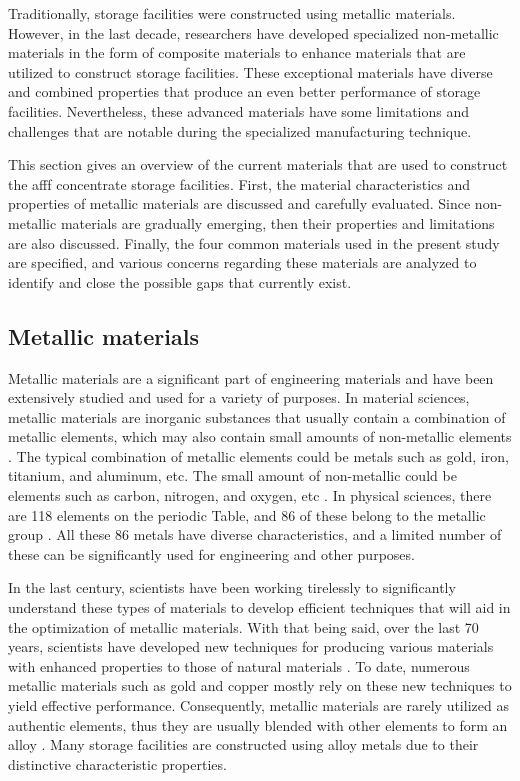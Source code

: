 Traditionally, storage facilities were constructed using metallic materials. However, in the last decade, researchers have developed specialized non-metallic materials in the form of composite materials to enhance materials that are utilized to construct storage facilities. These exceptional materials have diverse and combined properties that produce an even better performance of storage facilities. Nevertheless, these advanced materials have some limitations and challenges that are notable during the specialized manufacturing technique. 

This section gives an overview of the current materials that are used to construct the \acrshort{afff} concentrate storage facilities. First, the material characteristics and properties of metallic materials are discussed and carefully evaluated. Since non-metallic materials are gradually emerging, then their properties and limitations are also discussed. Finally, the four common materials used in the present study are specified, and various concerns regarding these materials are analyzed to identify and close the possible gaps that currently exist.   

\subsection{Metallic materials}
Metallic materials are a significant part of engineering materials and have been extensively studied and used for a variety of purposes.  In material sciences, metallic materials are inorganic substances that usually contain a combination of metallic elements, which may also contain small amounts of non-metallic elements \cite{rawlings2009materials}. The typical combination of metallic elements could be metals such as gold, iron, titanium, and aluminum, etc. The small amount of non-metallic could be elements such as carbon, nitrogen, and oxygen, etc \cite{hench2005biomaterials}. In physical sciences, there are 118 elements on the periodic Table, and 86 of these belong to the metallic group \cite{rawlings2009materials}. All these 86 metals have diverse characteristics, and a limited number of these can be significantly used for engineering and other purposes.  

In the last century, scientists have been working tirelessly to significantly understand these types of materials to develop efficient techniques that will aid in the optimization of metallic materials. With that being said, over the last 70 years, scientists have developed new techniques for producing various materials with enhanced properties to those of natural materials \cite{rawlings2009materials}. To date, numerous metallic materials such as gold and copper mostly rely on these new techniques to yield effective performance. Consequently, metallic materials are rarely utilized as authentic elements, thus they are usually blended with other elements to form an alloy \cite{hench2005biomaterials}. Many storage facilities are constructed using alloy metals due to their distinctive characteristic properties.

